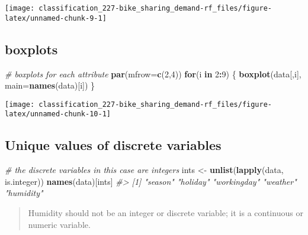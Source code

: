 \documentclass[]{book}
\newenvironment{Shaded}{\begin{snugshade}}{\end{snugshade}}
\newcommand{\CommentTok}[1]{\textcolor[rgb]{0.56,0.35,0.01}{\textit{#1}}}
\newcommand{\ControlFlowTok}[1]{\textcolor[rgb]{0.13,0.29,0.53}{\textbf{#1}}}
\newcommand{\DataTypeTok}[1]{\textcolor[rgb]{0.13,0.29,0.53}{#1}}
\newcommand{\DecValTok}[1]{\textcolor[rgb]{0.00,0.00,0.81}{#1}}
\newcommand{\KeywordTok}[1]{\textcolor[rgb]{0.13,0.29,0.53}{\textbf{#1}}}
\newcommand{\NormalTok}[1]{#1}
\newcommand{\OperatorTok}[1]{\textcolor[rgb]{0.81,0.36,0.00}{\textbf{#1}}}
\newcommand{\StringTok}[1]{\textcolor[rgb]{0.31,0.60,0.02}{#1}}
\begin{document}
\begin{center}\texttt{[image: classification\_227-bike\_sharing\_demand-rf\_files/figure-latex/unnamed-chunk-9-1]} \end{center}

\hypertarget{boxplots}{%
\subsection{boxplots}\label{boxplots}}

\begin{Shaded}
\begin{Highlighting}[]
\CommentTok{# boxplots for each attribute}
\KeywordTok{par}\NormalTok{(}\DataTypeTok{mfrow=}\KeywordTok{c}\NormalTok{(}\DecValTok{2}\NormalTok{,}\DecValTok{4}\NormalTok{))}
\ControlFlowTok{for}\NormalTok{(i }\ControlFlowTok{in} \DecValTok{2}\OperatorTok{:}\DecValTok{9}\NormalTok{) \{}
    \KeywordTok{boxplot}\NormalTok{(data[,i], }\DataTypeTok{main=}\KeywordTok{names}\NormalTok{(data)[i])}
\NormalTok{\}}
\end{Highlighting}
\end{Shaded}

\begin{center}\texttt{[image: classification\_227-bike\_sharing\_demand-rf\_files/figure-latex/unnamed-chunk-10-1]} \end{center}

\hypertarget{unique-values-of-discrete-variables}{%
\subsection{Unique values of discrete variables}\label{unique-values-of-discrete-variables}}

\begin{Shaded}
\begin{Highlighting}[]
\CommentTok{# the discrete variables in this case are integers}
\NormalTok{ints <-}\StringTok{ }\KeywordTok{unlist}\NormalTok{(}\KeywordTok{lapply}\NormalTok{(data, is.integer))}
\KeywordTok{names}\NormalTok{(data)[ints]}
\CommentTok{#> [1] "season"     "holiday"    "workingday" "weather"    "humidity"}
\end{Highlighting}
\end{Shaded}

\begin{quote}
Humidity should not be an integer or discrete variable; it is a continuous or numeric variable.
\end{quote}
\end{document}
